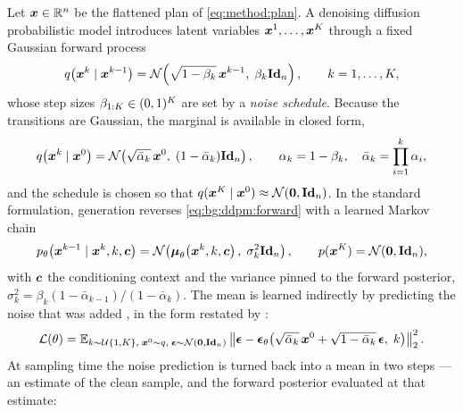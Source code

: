 Let $\boldsymbol{x} \in \mathbb{R}^{n}$ be the flattened plan of \eqref{eq:method:plan}. A denoising diffusion probabilistic model
\parencite{sohl2015deep,ho2020denoising} introduces latent variables
$\boldsymbol{x}^{1},\dots,\boldsymbol{x}^{K}$ through a fixed Gaussian forward process
\begin{equation}\label{eq:bg:ddpm:forward}
  q\!\left(\boldsymbol{x}^{k} \mid \boldsymbol{x}^{k-1}\right)
  = \mathcal{N}\!\left(\sqrt{1-\beta_{k}}\,\boldsymbol{x}^{k-1},\; \beta_{k}\textbf{Id}_{n}\right),
  \qquad k = 1,\dots,K ,
\end{equation}
whose step sizes $\beta_{1:K} \in (0,1)^{K}$ are set by a \emph{noise schedule}. Because
the transitions are Gaussian, the marginal is available in closed form,
\begin{equation}\label{eq:bg:ddpm:marginal}
  q\!\left(\boldsymbol{x}^{k} \mid \boldsymbol{x}^{0}\right)
  = \mathcal{N}\!\left(\sqrt{\bar{\alpha}_{k}}\,\boldsymbol{x}^{0},\;(1-\bar{\alpha}_{k})\textbf{Id}_{n}\right),
  \qquad
  \alpha_{k} = 1-\beta_{k}, \quad \bar{\alpha}_{k} = \prod_{i=1}^{k}\alpha_{i},
\end{equation}
and the schedule is chosen so that $q(\boldsymbol{x}^{K}\mid\boldsymbol{x}^{0}) \approx \mathcal{N}(\boldsymbol{0},\textbf{Id}_{n})$.
In the standard formulation, generation reverses \eqref{eq:bg:ddpm:forward} with a learned Markov chain
\begin{equation}\label{eq:bg:ddpm:reverse}
  p_{\theta}\!\left(\boldsymbol{x}^{k-1}\mid\boldsymbol{x}^{k},k,\boldsymbol{c}\right)
  = \mathcal{N}\!\left(\boldsymbol{\mu}_{\theta}\!\left(\boldsymbol{x}^{k},k,\boldsymbol{c}\right),\;\sigma_{k}^{2}\textbf{Id}_{n}\right),
  \qquad p(\boldsymbol{x}^{K}) = \mathcal{N}(\boldsymbol{0},\textbf{Id}_{n}),
\end{equation}
with $\boldsymbol{c}$ the conditioning context and the variance pinned to the forward posterior,
$\sigma_{k}^{2} = \beta_{k}(1-\bar{\alpha}_{k-1})/(1-\bar{\alpha}_{k})$. The mean is learned
indirectly by predicting the noise that was added \parencite{ho2020denoising}, in the form
restated by \parencite[Sec.~4]{romer2025diffusion}:
\begin{equation}\label{eq:bg:ddpm:loss}
  \mathcal{L}(\theta)
  = \mathbb{E}_{k \sim \mathcal{U}\{1,K\},\; \boldsymbol{x}^{0}\sim q,\; \boldsymbol{\epsilon}\sim\mathcal{N}(\boldsymbol{0},\textbf{Id}_{n})}
    \left\|\boldsymbol{\epsilon} - \boldsymbol{\epsilon}_{\theta}\!\left(
      \sqrt{\bar{\alpha}_{k}}\,\boldsymbol{x}^{0} + \sqrt{1-\bar{\alpha}_{k}}\,\boldsymbol{\epsilon},\;k\right)\right\|_{2}^{2}.
\end{equation}
At sampling time the noise prediction is turned back into a mean in two steps --- an estimate of
the clean sample, and the forward posterior evaluated at that estimate:
